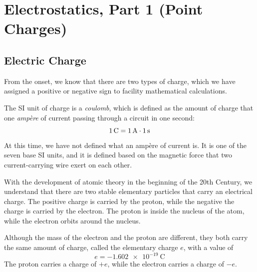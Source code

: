\chapter{Electrostatics, Part 1 (Point Charges)}
\label{chapter:electrostatics1}


\section{Electric Charge}

From the onset, we know that there are two types of charge, which we have
assigned a positive or negative sign to facility mathematical calculations.

The SI unit of charge is a \emph{coulomb}, which is defined as the amount of
charge that one \emph{amp\`{e}re} of current passing through a circuit in one
second:
\begin{equation*}
  \SI1\coulomb=\SI1\ampere\cdot\SI1\second
\end{equation*}
At this time, we have not defined what an amp\`{e}re of current is. It is one
of the seven base SI units, and it is defined based on the magnetic force that
two current-carrying wire exert on each other.

With the development of atomic theory in the beginning of the 20th Century, we
understand that there are two stable elementary particles that carry an
electrical charge. The positive charge is carried by the proton, while the
negative the charge is carried by the electron. The proton is inside the
nucleus of the atom, while the electron orbits around the nucleus.

%


Although the mass of the electron and the proton are different, they both carry
the same amount of charge, called the elementary charge $e$, with a value of
\begin{equation*}
  e=\SI{-1.602e-19}\coulomb
\end{equation*}
The proton carries a charge of $+e$, while the electron carries a charge of
$-e$.


